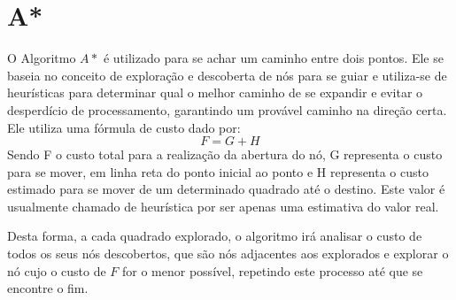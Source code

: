 \section{A*}
O Algoritmo $A*$ \cite{Astar} é utilizado para se achar um caminho entre dois pontos. Ele se baseia no conceito de exploração e descoberta de nós para se guiar e utiliza-se de heurísticas para determinar qual o melhor caminho de se expandir e evitar o desperdício de processamento, garantindo um provável caminho na direção certa. 
Ele utiliza uma fórmula de custo dado por:
\begin{equation}
	F = G + H
\end{equation}
Sendo F o custo total para a realização da abertura do nó, G representa o custo para se mover, em linha reta do ponto inicial ao ponto e H representa o custo estimado para se mover de um determinado quadrado até o destino. Este valor é usualmente chamado de heurística por ser apenas uma estimativa do valor real.

Desta forma, a cada quadrado explorado, o algoritmo irá analisar o custo de todos os seus nós descobertos, que são nós adjacentes aos explorados e explorar o nó cujo o custo de $F$ for o menor possível, repetindo este processo até que se encontre o fim. 